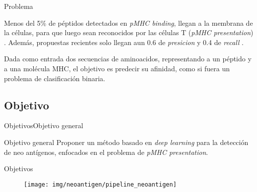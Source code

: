 \documentclass[10pt]{beamer}
\newcommand{\1}{
	\setbeamertemplate{background}{
		\texttt{[image: img/1]}
		\tikz[overlay] \fill[fill opacity=0.75,fill=white] (0,0) rectangle (-\paperwidth,\paperheight);
	}
}
\begin{document}
\begin{frame}{Problema}{}
	
\begin{block}{}
	Menos del 5\% de péptidos detectados en \textit{pMHC binding}, llegan a la membrana de la células, para que luego sean reconocidos por las células T (\textit{pMHC presentation}) \cite{de2020neoantigen, mill2022neoms, bulik2019deep, bassani2015mass, yadav2014predicting}. Además, propuestas recientes solo llegan aun 0.6 de \textit{presicion} y 0.4 de \textit{recall} \cite{mill2022neoms}. 
\end{block}

\begin{block}{}
	Dada como entrada dos secuencias de aminoacidos, representando a un péptido y a una molécula MHC, el objetivo es predecir su afinidad, como si fuera un problema de clasificación binaria.
\end{block}
	
\end{frame}

\subsection{Objetivo}

\begin{frame}{Objetivos}{Objetivo general}	
	\begin{block}{Objetivo general}
		Proponer un método basado en \textit{deep learning} para la detección de neo antígenos, enfocados en el problema de \textit{pMHC presentation}. 
	\end{block}	
\end{frame}

\begin{frame}{Objetivos}{}	
	\begin{figure}
		\texttt{[image: img/neoantigen/pipeline\_neoantigen]}
	\end{figure}
\end{frame}
\end{document}
